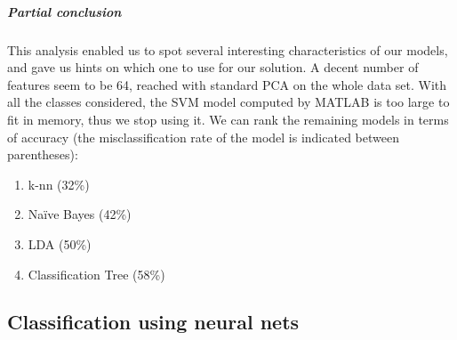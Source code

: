 \documentclass[twocolumn]{article}%
\begin{document}
	\subparagraph{Partial conclusion}
	This analysis enabled us to spot several interesting characteristics of our models, and gave us hints on which one to use for our solution. A decent number of features seem to be 64, reached with standard PCA on the whole data set. With all the classes considered, the SVM model computed by MATLAB is too large to fit in memory, thus we stop using it. We can rank the remaining models in terms of accuracy (the misclassification rate of the model is indicated between parentheses):
	\begin{enumerate}
	\item k-nn (32\%)
	\item Naïve Bayes (42\%)
	\item LDA (50\%)
	\item Classification Tree (58\%)
	\end{enumerate}
	
	
	\subsection{Classification using neural nets}	
	
\end{document}
